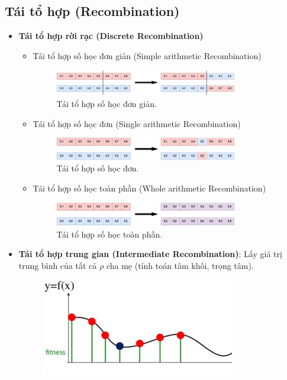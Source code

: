 \documentclass{book}
\begin{document}
\subsection{Tái tổ hợp (Recombination)}
\begin{itemize}
    \item \textbf{Tái tổ hợp rời rạc (Discrete Recombination)}
    \begin{itemize}
        \item Tái tổ hợp số học đơn giản (Simple arithmetic Recombination)
        \begin{figure}[H]
            \centering
            \includegraphics[width=0.8\textwidth]{images/simple_arithmetic_recombination.png}
            \caption{Tái tổ hợp số học đơn giản.}
        \end{figure}
        \item Tái tổ hợp số học đơn (Single arithmetic Recombination)
        \begin{figure}[H]
            \centering
            \includegraphics[width=0.8\textwidth]{images/single_arithmetic_recombination.png}
            \caption{Tái tổ hợp số học đơn.}
        \end{figure}
        \item Tái tổ hợp số học toàn phần (Whole arithmetic Recombination)
        \begin{figure}[H]
            \centering
            \includegraphics[width=0.8\textwidth]{images/whole_arithmetic_recombination.png}
            \caption{Tái tổ hợp số học toàn phần.}
        \end{figure}
    \end{itemize}
    \item \textbf{Tái tổ hợp trung gian (Intermediate Recombination)}: Lấy giá trị trung bình của tất cả $\rho$ cha mẹ (tính toán tâm khối, trọng tâm).
    \begin{figure}[H]
        \centering
        \includegraphics[width=0.8\textwidth]{images/intermediate_recombination.png}

\end{figure}
\end{itemize}
\end{document}
